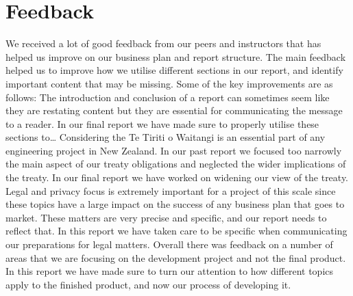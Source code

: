 \section{Feedback}
We received a lot of good feedback from our peers and instructors that has helped us improve on our business plan and report structure. The main feedback helped us to improve how we utilise different sections in our report, and identify important content that may be missing. Some of the key improvements are as follows:
The introduction and conclusion of a report can sometimes seem like they are restating content but they are essential for communicating the message to a reader. In our final report we have made sure to properly utilise these sections to…
Considering the Te Tiriti o Waitangi is an essential part of any engineering project in New Zealand. In our past report we focused too narrowly the main aspect of our treaty obligations and neglected the wider implications of the treaty. In our final report we have worked on widening our view of the treaty.
Legal and privacy focus is extremely important for a project of this scale since these topics have a large impact on the success of any business plan that goes to market. These matters are very precise and specific, and our report needs to reflect that. In this report we have taken care to be specific when communicating our preparations for legal matters.
Overall there was feedback on a number of areas that we are focusing on the development project and not the final product. In this report we have made sure to turn our attention to how different topics apply to the finished product, and now our process of developing it. 

